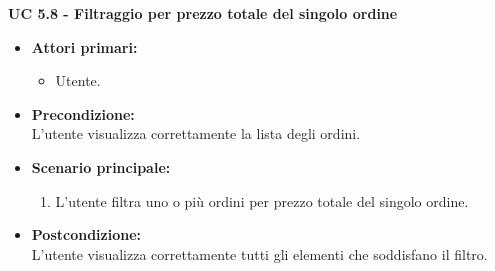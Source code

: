 \vspace{0.5cm}

\noindent \textbf{\large UC 5.8 - Filtraggio per prezzo totale del singolo ordine}
\label{uc:filtraggio-prezzo-totale-ord}
\begin{itemize}

	\item \textbf{Attori primari: }
		\begin{itemize}
			\item Utente.
		\end{itemize}

	\item \textbf{Precondizione: }\\[0.3cm]
		L'utente visualizza correttamente la lista degli ordini.

	\item \textbf{Scenario principale: }
		\begin{enumerate}
			\item L'utente filtra uno o più ordini per prezzo totale del singolo ordine.
		\end{enumerate}
		

	\item \textbf{Postcondizione: }\\[0.3cm]
		L'utente visualizza correttamente tutti gli elementi che soddisfano il filtro.

\end{itemize}

\vspace{0.5cm}

